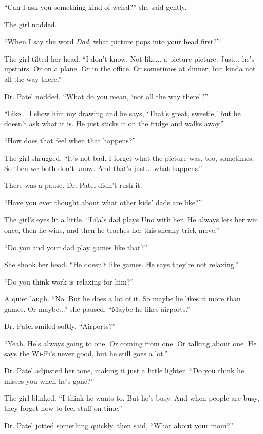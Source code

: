 ``Can I ask you something kind of weird?'' she said gently.

The girl nodded.

``When I say the word \textit{Dad}, what picture pops into your head first?''

The girl tilted her head. ``I don’t know. Not like... a picture-picture. Just... he’s upstairs. Or on a plane. Or in the office. Or sometimes at dinner, but kinda not all the way there.''

Dr. Patel nodded. ``What do you mean, ‘not all the way there’?''

``Like... I show him my drawing and he says, ‘That’s great, sweetie,’ but he doesn’t ask what it is. He just sticks it on the fridge and walks away.''

``How does that feel when that happens?''

The girl shrugged. ``It’s not bad. I forget what the picture was, too, sometimes. So then we both don’t know. And that’s just... what happens.''

There was a pause. Dr. Patel didn’t rush it.

``Have you ever thought about what other kids’ dads are like?''

The girl’s eyes lit a little. ``Lila’s dad plays Uno with her. He always lets her win once, then he wins, and then he teaches her this sneaky trick move.''

``Do you and your dad play games like that?''

She shook her head. ``He doesn’t like games. He says they’re not relaxing.''

``Do you think work is relaxing for him?''

A quiet laugh. ``No. But he does a lot of it. So maybe he likes it more than games. Or maybe...'' she paused. ``Maybe he likes airports.''

Dr. Patel smiled softly. ``Airports?''

``Yeah. He’s always going to one. Or coming from one. Or talking about one. He says the Wi-Fi’s never good, but he still goes a lot.''

Dr. Patel adjusted her tone, making it just a little lighter. ``Do you think he misses you when he’s gone?''

The girl blinked. ``I think he wants to. But he’s busy. And when people are busy, they forget how to feel stuff on time.''

Dr. Patel jotted something quickly, then said, ``What about your mom?''

